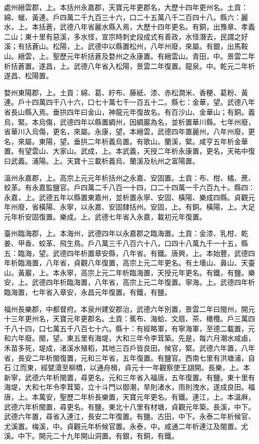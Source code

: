 \begin{pinyinscope}
 處州縉雲郡，上。本括州永嘉郡，天寶元年更郡名，大歷十四年更州名。土貢：綿、蠟、黃連。戶四萬二千九百三十六，口二十五萬八千二百四十八。縣六：麗水，上。本括蒼，武德八年省麗水縣入焉，大歷十四年更名。有銅，出豫章、孝義二山；東十里有惡溪，多水怪，宣宗時刺史段成式有善政，水怪潛去，民謂之好溪；有括蒼山。松陽，上。武德中以縣置松州，八年州廢，來屬。有銀，出馬鞍山。縉雲，上。聖歷元年析括蒼及婺州之永康置。有縉雲山。青田，中。景雲二年析括蒼置。遂昌，上。武德八年省入松陽，景雲二年復置。龍泉。中。乾元二年析遂昌、松陽置。



 婺州東陽郡，上。土貢：綿、葛、紵布、藤紙、漆、赤松澗米、香粳、葛粉、黃連。戶十四萬四千八十六，口七十萬七千一百五十二。縣七：金華，望。武德八年省長山縣入焉。垂拱四年曰金山，神龍元年復故名。有百沙山、金華山；有銅。義烏，緊。本烏傷，武德四年以縣置綢州，因綢巖為名，並析置華川縣。七年州廢，省華川入烏傷，更名，來屬。永康，望。本縉雲，武德四年置麗州，八年州廢，更名，來屬。東陽，望。垂拱二年析義烏置。有歌山。蘭溪，緊。咸亨五年析金華置。有望雲山、大家山。武成，上。本武義，天授二年析永康置，更名，天祐中復曰武義。浦陽。上。天寶十三載析義烏、蘭溪及杭州之富陽置。



 溫州永嘉郡，上。高宗上元元年析括州之永嘉、安固置。土貢：布、柑、橘、蔗、蛟革。有永嘉監鹽官。戶四萬二千八百一十四，口二十四萬一千六百九十。縣四：永嘉，上。武德五年以縣置東嘉州，並析置永寧、安固、橫陽、樂成四縣。貞觀元年州廢，省橫陽、永寧，以永嘉、安固隸括州。安固，上。有銅。橫陽，上。大足元年析安固復置。樂成。上。武德七年省入永嘉，載初元年復置。



 臺州臨海郡，上。本海州，武德四年以永嘉郡之臨海置。土貢：金漆、乳柑、乾姜、甲香、蛟革、飛生鳥。戶八萬三千八百六十八，口四十八萬九千一十五，縣五：臨海，望。武德四年析置章安縣，八年省。有鐵。唐興，上。本始豐，武德四年析臨海置，八年省，貞觀八年復置，高宗上元二年更名。有土墻山、鼻山、天臺山。黃巖，上。本永寧，高宗上元二年析臨海置，天授元年更名。有鐵，有鹽。樂安，上。武德四年析臨海置，八年省，高宗上元二年復置。寧海。上。武德四年析臨海置，七年省入章安，永昌元年復置。有鐵，有鹽。



 福州長樂郡，中都督府。本泉州建安郡治，武德六年別置，景雲二年曰閩州，開元十三年更州名，天寶元年更郡名。土貢：蕉布、海蛤、文扇、茶、橄欖。戶三萬四千八十四，口七萬五千八百七十六。縣十：有經略軍，有寧海軍，至德二載置，元和六年廢。閩，望。東五里有海堤，大和三年令李茸築。先是，每六月潮水咸鹵，禾苗多死，堤成，渚溪水殖稻，其地三百戶皆良田。候官，緊。武德六年置，八年省，長安二年析閩復置，元和三年省，五年復置。有鹽官。西南七里有洪塘浦，自石江而東，經甓瀆至柳橋，以通舟楫，貞元十一年觀察使王翃開。長樂，上。本新寧，武德六年析閩置，尋更名。元和三年省入福唐，五年復置。有鹽。東十里有海堤，大和七年令李茸築，立十斗門以御潮，旱則渚水，雨則洩水，遂成良田。福唐，上。本萬安，聖歷二年析長樂置，天寶元年更名。有鐵。連江，上。本溫麻，武德六年析閩置，尋更名。有鹽。東北十八里有材塘，貞觀元年築。長溪，中下。武德六年置，尋省入連江，長安二年復置。有鹽。古田，中下。永泰二年析候官、尤溪置。梅溪，中。貞觀元年析候官置。永泰，中。咸通二年析連江及閩置。尤溪。中下。開元二十九年開山洞置。有銀，有銅，有鐵。




\end{pinyinscope}
